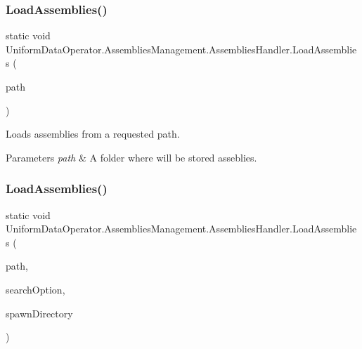 \subsubsection{\texorpdfstring{Load\+Assemblies()}{LoadAssemblies()}\hspace{0.1cm}{\footnotesize\ttfamily [1/2]}}
{\footnotesize\ttfamily static void Uniform\+Data\+Operator.\+Assemblies\+Management.\+Assemblies\+Handler.\+Load\+Assemblies (\begin{DoxyParamCaption}\item[{string}]{path }\end{DoxyParamCaption})\hspace{0.3cm}{\ttfamily [static]}}



Loads assemblies from a requested path. 


\begin{DoxyParams}{Parameters}
{\em path} & A folder where will be stored asseblies.\\
\hline
\end{DoxyParams}
\mbox{\label{class_uniform_data_operator_1_1_assemblies_management_1_1_assemblies_handler_a319a18fddc641dc2090dcf51ddcb015d}} 
\subsubsection{\texorpdfstring{Load\+Assemblies()}{LoadAssemblies()}\hspace{0.1cm}{\footnotesize\ttfamily [2/2]}}
{\footnotesize\ttfamily static void Uniform\+Data\+Operator.\+Assemblies\+Management.\+Assemblies\+Handler.\+Load\+Assemblies (\begin{DoxyParamCaption}\item[{string}]{path,  }\item[{Search\+Option}]{search\+Option,  }\item[{bool}]{spawn\+Directory }\end{DoxyParamCaption})\hspace{0.3cm}{\ttfamily [static]}}



